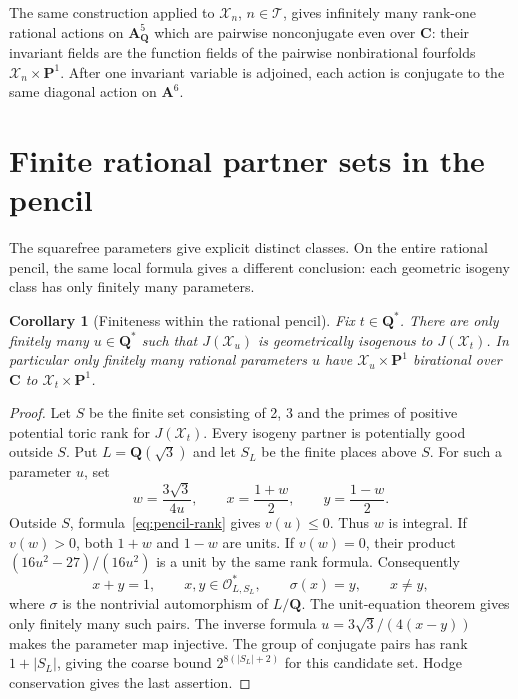\documentclass[11pt]{article}
\newtheorem{corollary}[theorem]{Corollary}
\theoremstyle{remark}
\newcommand{\A}{\mathbf A}
\newcommand{\C}{\mathbf C}
\newcommand{\PP}{\mathbf P}
\begin{document}
The same construction applied to \(\mathcal X_n\), \(n\in\mathcal T\),
gives infinitely many rank-one rational actions on \(\A^5_{\mathbf Q}\)
which are pairwise nonconjugate even over \(\C\): their invariant fields
are the function fields of the pairwise nonbirational fourfolds
\(\mathcal X_n\times\PP^1\). After one invariant variable is adjoined,
each action is conjugate to the same diagonal action on \(\A^6\).

\section{Finite rational partner sets in the pencil}
\label{sec:rational-partners}

The squarefree parameters give explicit distinct classes. On the entire
rational pencil, the same local formula gives a different conclusion:
each geometric isogeny class has only finitely many parameters.

\begin{corollary}[Finiteness within the rational pencil]
\label{cor:rational-pencil-partners}
%
%
%
Fix \(t\in\mathbf Q^*\). There are only finitely many \(u\in\mathbf Q^*\)
such that \(J(\mathcal X_u)\) is geometrically isogenous to
\(J(\mathcal X_t)\). In particular only finitely many rational parameters
\(u\) have \(\mathcal X_u\times\PP^1\) birational over \(\C\) to
\(\mathcal X_t\times\PP^1\).
\end{corollary}

\begin{proof}
Let \(S\) be the finite set consisting of 2, 3 and the primes of positive
potential toric rank for \(J(\mathcal X_t)\). Every isogeny partner is
potentially good outside \(S\). Put \(L=\mathbf Q(\sqrt3)\) and let
\(S_L\) be the finite places above \(S\). For such a parameter \(u\), set
\[
 w=\frac{3\sqrt3}{4u},\qquad x=\frac{1+w}{2},\qquad y=\frac{1-w}{2}.
\]
Outside \(S\), formula~\eqref{eq:pencil-rank} gives \(v(u)\leq0\).
Thus \(w\) is integral. If \(v(w)>0\), both \(1+w\) and \(1-w\)
are units. If \(v(w)=0\), their product
\((16u^2-27)/(16u^2)\) is a unit by the same rank formula.
Consequently
\[
 x+y=1,\qquad x,y\in\mathcal O_{L,S_L}^{*},\qquad
 \sigma(x)=y,\qquad x\ne y,
\]
where \(\sigma\) is the nontrivial automorphism of \(L/\mathbf Q\).
The unit-equation theorem \cite[Theorem~1.1]{BeukersSchlickewei}
gives only finitely many such pairs. The inverse formula
\(u=3\sqrt3/(4(x-y))\) makes the parameter map injective.
The group of conjugate pairs has rank \(1+|S_L|\), giving the coarse
bound \(2^{8(|S_L|+2)}\) for this candidate set. Hodge conservation
\cite[Theorem~1.3]{RuddM1} gives the last assertion.
%
%
\end{proof}
\end{document}
